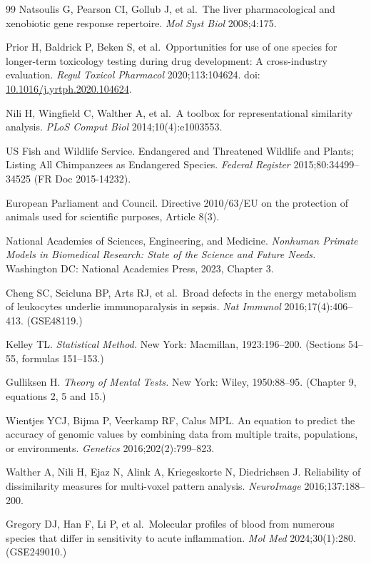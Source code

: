 \documentclass[11pt,a4paper]{article}
\begin{document}
\begin{thebibliography}{99}
Natsoulis G, Pearson CI, Gollub J, et al.~The liver pharmacological and xenobiotic gene response repertoire. \emph{Mol Syst Biol} 2008;4:175.

Prior H, Baldrick P, Beken S, et al.~Opportunities for use of one species for longer-term toxicology testing during drug development: A cross-industry evaluation. \emph{Regul Toxicol Pharmacol} 2020;113:104624. doi: \href{https://doi.org/10.1016/j.yrtph.2020.104624}{10.1016/j.yrtph.2020.104624}.

Nili H, Wingfield C, Walther A, et al.~A toolbox for representational similarity analysis. \emph{PLoS Comput Biol} 2014;10(4):e1003553.

US Fish and Wildlife Service. Endangered and Threatened Wildlife and Plants; Listing All Chimpanzees as Endangered Species. \emph{Federal Register} 2015;80:34499--34525 (FR Doc 2015-14232).

European Parliament and Council. Directive 2010/63/EU on the protection of animals used for scientific purposes, Article 8(3).

National Academies of Sciences, Engineering, and Medicine. \emph{Nonhuman Primate Models in Biomedical Research: State of the Science and Future Needs.} Washington DC: National Academies Press, 2023, Chapter 3.

Cheng SC, Scicluna BP, Arts RJ, et al.~Broad defects in the energy metabolism of leukocytes underlie immunoparalysis in sepsis. \emph{Nat Immunol} 2016;17(4):406--413. (GSE48119.)

Kelley TL. \emph{Statistical Method.} New York: Macmillan, 1923:196--200. (Sections 54--55, formulas 151--153.)

Gulliksen H. \emph{Theory of Mental Tests.} New York: Wiley, 1950:88--95. (Chapter 9, equations 2, 5 and 15.)

Wientjes YCJ, Bijma P, Veerkamp RF, Calus MPL. An equation to predict the accuracy of genomic values by combining data from multiple traits, populations, or environments. \emph{Genetics} 2016;202(2):799--823.

Walther A, Nili H, Ejaz N, Alink A, Kriegeskorte N, Diedrichsen J. Reliability of dissimilarity measures for multi-voxel pattern analysis. \emph{NeuroImage} 2016;137:188--200.

Gregory DJ, Han F, Li P, et al.~Molecular profiles of blood from numerous species that differ in sensitivity to acute inflammation. \emph{Mol Med} 2024;30(1):280. (GSE249010.)


\end{thebibliography}
\end{document}
